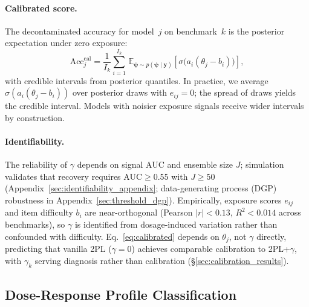 \paragraph{Calibrated score.}
The decontaminated accuracy for model~$j$ on benchmark~$k$ is the posterior expectation under zero exposure:
\begin{equation}
\label{eq:calibrated}
    \text{Acc}_{j}^{\text{cal}} = \frac{1}{I_k} \sum_{i=1}^{I_k}\, \mathbb{E}_{\boldsymbol{\psi} \sim p(\boldsymbol{\psi} \mid \mathbf{y})} \!\left[\sigma\!\bigl(a_i(\theta_j - b_i)\bigr)\right],
\end{equation}
with credible intervals from posterior quantiles. In practice, we average $\sigma(a_i(\theta_j - b_i))$ over posterior draws with $e_{ij}=0$; the spread of draws yields the credible interval. Models with noisier exposure signals receive wider intervals by construction.

\paragraph{Identifiability.}
\label{sec:fisher}
\label{sec:value_decomposition}
The reliability of $\gamma$ depends on signal AUC and ensemble size $J$; simulation validates that recovery requires AUC$\geq$0.55 with $J \geq 50$ (Appendix~\ref{sec:identifiability_appendix}; data-generating process (DGP) robustness in Appendix~\ref{sec:threshold_dgp}). Empirically, exposure scores $e_{ij}$ and item difficulty $b_i$ are near-orthogonal (Pearson $|r|<0.13$, $R^2<0.014$ across benchmarks), so $\gamma$ is identified from dosage-induced variation rather than confounded with difficulty. Eq.~\eqref{eq:calibrated} depends on $\theta_j$, not $\gamma$ directly, predicting that vanilla 2PL ($\gamma\!=\!0$) achieves comparable calibration to 2PL+$\gamma$, with $\gamma_k$ serving diagnosis rather than calibration (\S\ref{sec:calibration_results}).

\subsection{Dose-Response Profile Classification}
\label{sec:classification}

